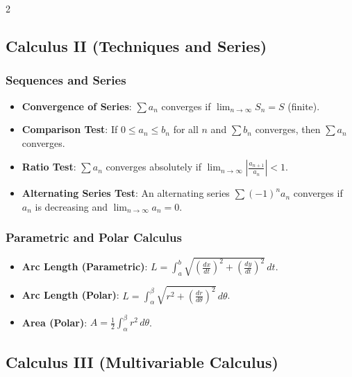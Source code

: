 \begin{multicols}{2}
\subsection*{Calculus II (Techniques and Series)}
\subsubsection*{Sequences and Series}
\begin{itemize}
\item \textbf{Convergence of Series}: $\sum a_n$ converges if $\lim_{n \to \infty} S_n = S$ (finite).
\item \textbf{Comparison Test}: If $0 \leq a_n \leq b_n$ for all $n$ and $\sum b_n$ converges, then $\sum a_n$ converges.
\item \textbf{Ratio Test}: $\sum a_n$ converges absolutely if $\lim_{n \to \infty} \left| \frac{a_{n+1}}{a_n} \right| < 1$.
\item \textbf{Alternating Series Test}: An alternating series $\sum (-1)^n a_n$ converges if $a_n$ is decreasing and $\lim_{n \to \infty} a_n = 0$.
\end{itemize}

\subsubsection*{Parametric and Polar Calculus}
\begin{itemize}
\item \textbf{Arc Length (Parametric)}: $L = \int_a^b \sqrt{\left( \frac{dx}{dt} \right)^2 + \left( \frac{dy}{dt} \right)^2} \, dt$.
\item \textbf{Arc Length (Polar)}: $L = \int_\alpha^\beta \sqrt{r^2 + \left( \frac{dr}{d\theta} \right)^2} \, d\theta$.
\item \textbf{Area (Polar)}: $A = \frac{1}{2} \int_\alpha^\beta r^2 \, d\theta$.
\end{itemize}

\subsection*{Calculus III (Multivariable Calculus)}

\end{multicols}
